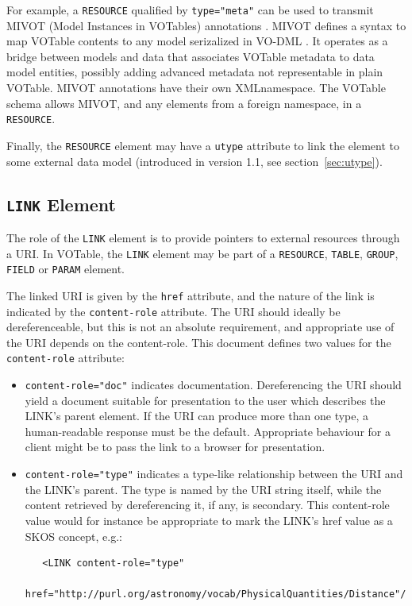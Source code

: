 \documentclass[11pt,a4paper]{ivoa}
\def\Aref#1{section~\ref{#1}}
\let\fg=\color
\def\attr#1{{\tt{\fg{DarkRed}#1}}}
\def\elem#1{{\tt{\fg{DarkRed}#1}}}
\def\attrval#1#2{{\tt{\fg{DarkRed}#1}="{\fg{DarkPurple}#2}"}}
\begin{document}
For example, a \elem{RESOURCE} qualified by
\attrval{type}{meta} can be used to transmit
MIVOT (Model Instances in VOTables) annotations \citep{2023ivoa.spec.0620M}.
MIVOT defines a syntax to map VOTable
contents to any model serizalized in VO-DML \citep{2018ivoa.spec.0910L}.
It operates as a bridge between models and data that associates VOTable
metadata to data model entities, possibly adding advanced metadata not
representable in plain VOTable.
MIVOT annotations have their own XMLnamespace.  The VOTable schema allows MIVOT,
and any elements from a foreign namespace, in a \elem{RESOURCE}.

Finally, the \elem{RESOURCE} element may have a \attr{utype} attribute
to link the element to some external data model
(introduced in version 1.1, see \Aref{sec:utype}).

\subsection{\elem{LINK} Element}
\label{sec:link}
\label{elem:LINK}

The role of the {\elem{LINK}} element is to provide pointers
to external resources
through a URI. In VOTable, the {\elem{LINK}}
element may be part of a {\elem{RESOURCE}},
{\elem{TABLE}}, \elem{GROUP}, {\elem{FIELD}} or \elem{PARAM} element.

The linked URI is given by the \attr{href} attribute,
and the nature of the link is indicated by the \attr{content-role} attribute.
The URI should ideally be dereferenceable,
but this is not an absolute requirement,
and appropriate use of the URI depends on the content-role.
This document defines two values for the \attr{content-role} attribute:

\begin{itemize}
\item \attrval{content-role}{doc} indicates documentation.
      Dereferencing the URI should yield a document suitable for
      presentation to the user which describes the LINK's parent element.
      If the URI can produce more than one type, a human-readable response
      must be the default.
      Appropriate behaviour for a client might be to pass the link to a browser
      for presentation.

\item \attrval{content-role}{type} indicates a type-like relationship
      between the URI and the LINK's parent.
      The type is named by the URI string itself,
      while the content retrieved by dereferencing it, if any, is secondary.
      This content-role value would for instance be appropriate
      to mark the LINK's href value as a SKOS concept, e.g.:
      \begin{verbatim}
   <LINK content-role="type"
         href="http://purl.org/astronomy/vocab/PhysicalQuantities/Distance"/>
      \end{verbatim}
\end{itemize}
\end{document}
